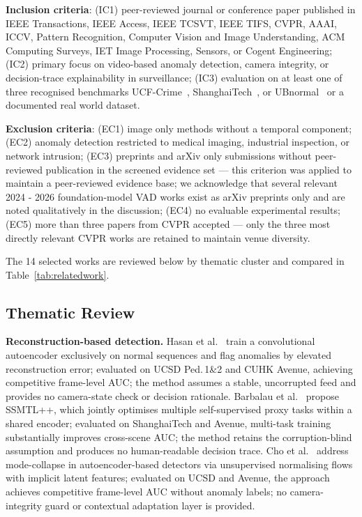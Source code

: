 \documentclass[sensors,article,submit,pdftex,moreauthors]{Definitions/mdpi}
\begin{document}
\noindent\textbf{Inclusion criteria}: (IC1) peer-reviewed journal or conference paper published in IEEE Transactions, IEEE Access, IEEE TCSVT, IEEE TIFS, CVPR, AAAI, ICCV, Pattern Recognition, Computer Vision and Image Understanding, ACM Computing Surveys, IET Image Processing, Sensors, or Cogent Engineering; (IC2) primary focus on video-based anomaly detection, camera integrity, or decision-trace explainability in surveillance; (IC3) evaluation on at least one of three recognised benchmarks UCF-Crime~\cite{sultani2018realworld}, ShanghaiTech~\cite{georgescu2021anomaly}, or UBnormal~\cite{acsintoae2022ubnormal} or a documented real world dataset.
 
\noindent\textbf{Exclusion criteria}: (EC1) image only methods without a temporal component; (EC2) anomaly detection restricted to medical imaging, industrial inspection, or network intrusion; (EC3) preprints and arXiv only submissions without peer-reviewed publication in the screened evidence set — this criterion was applied to maintain a peer-reviewed evidence base; we acknowledge that several relevant 2024 - 2026 foundation-model VAD works exist as arXiv preprints only and are noted qualitatively in the discussion; (EC4) no evaluable experimental results; (EC5) more than three papers from CVPR accepted — only the three most directly relevant CVPR works are retained to maintain venue diversity.
 
The 14 selected works are reviewed below by thematic cluster and compared in Table~\ref{tab:relatedwork}.
 
\subsection{Thematic Review}
 
\textbf{Reconstruction-based detection.}
Hasan et al.~\cite{hasan2016anomaly} train a convolutional autoencoder exclusively on normal sequences and flag anomalies by elevated reconstruction error; evaluated on UCSD Ped.\,1\&2 and CUHK Avenue, achieving competitive frame-level AUC; the method assumes a stable, uncorrupted feed and provides no camera-state check or decision rationale.
Barbalau et al.~\cite{barbalau2023ssmtl} propose SSMTL++, which jointly optimises multiple self-supervised proxy tasks within a shared encoder; evaluated on ShanghaiTech and Avenue, multi-task training substantially improves cross-scene AUC; the method retains the corruption-blind assumption and produces no human-readable decision trace.
Cho et al.~\cite{cho2023lookonce} address mode-collapse in autoencoder-based detectors via unsupervised normalising flows with implicit latent features; evaluated on UCSD and Avenue, the approach achieves competitive frame-level AUC without anomaly labels; no camera-integrity guard or contextual adaptation layer is provided.
 
\end{document}
